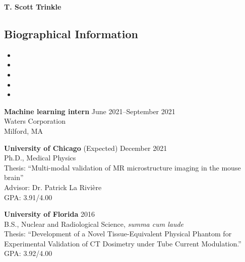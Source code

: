 \documentclass[10pt,letterpaper]{article}
\begin{document}
\begin{center}
{\LARGE \textbf{T. Scott Trinkle}}\\
\end{center}
\vspace{-1em}

\subsection*{Biographical Information}
\begin{itemize}[noitemsep]
\item[]  
\item[] \itab{} 
\item[] \itab{} 
\item[]  
\item[]  
\end{itemize}

\begin{etaremune}[labelsep=0.035\textwidth]
\item
  \textbf{Machine learning intern} \hfill June 2021--September 2021\\
  Waters Corporation\\
  Milford, MA
\end{etaremune}

\begin{etaremune}[labelsep=0.035\textwidth]
\item
  \textbf{University of Chicago} \hfill (Expected) December 2021\\
  Ph.D., Medical Physics\\
  Thesis: ``Multi-modal validation of MR microstructure imaging in the mouse brain''\\
  Advisor: Dr. Patrick La Rivi\`ere \\
  GPA: 3.91/4.00\\
\item
  \textbf{University of Florida} \hfill 2016\\
  B.S., Nuclear and Radiological Science, \textit{summa cum laude}\\
  Thesis: ``Development of a Novel Tissue-Equivalent Physical Phantom for Experimental Validation
  of CT Dosimetry under Tube Current Modulation.''\\ 
  GPA: 3.92/4.00\\
\end{etaremune}
\end{document}
